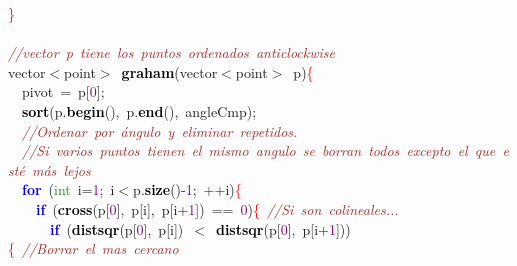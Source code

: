 \mbox{}\textcolor{Red}{\}} \\
\mbox{} \\
\mbox{}\textit{\textcolor{Brown}{//vector\ p\ tiene\ los\ puntos\ ordenados\ anticlockwise}} \\
\mbox{}vector\textcolor{BrickRed}{$<$}point\textcolor{BrickRed}{$>$}\ \textbf{\textcolor{Black}{graham}}\textcolor{BrickRed}{(}vector\textcolor{BrickRed}{$<$}point\textcolor{BrickRed}{$>$}\ p\textcolor{BrickRed}{)}\textcolor{Red}{\{} \\
\mbox{}\ \ pivot\ \textcolor{BrickRed}{=}\ p\textcolor{BrickRed}{[}\textcolor{Purple}{0}\textcolor{BrickRed}{];} \\
\mbox{}\ \ \textbf{\textcolor{Black}{sort}}\textcolor{BrickRed}{(}p\textcolor{BrickRed}{.}\textbf{\textcolor{Black}{begin}}\textcolor{BrickRed}{(),}\ p\textcolor{BrickRed}{.}\textbf{\textcolor{Black}{end}}\textcolor{BrickRed}{(),}\ angleCmp\textcolor{BrickRed}{);} \\
\mbox{}\ \ \textit{\textcolor{Brown}{//Ordenar\ por\ ángulo\ y\ eliminar\ repetidos.}} \\
\mbox{}\ \ \textit{\textcolor{Brown}{//Si\ varios\ puntos\ tienen\ el\ mismo\ angulo\ se\ borran\ todos\ excepto\ el\ que\ esté\ más\ lejos}} \\
\mbox{}\ \ \textbf{\textcolor{Blue}{for}}\ \textcolor{BrickRed}{(}\textcolor{ForestGreen}{int}\ i\textcolor{BrickRed}{=}\textcolor{Purple}{1}\textcolor{BrickRed}{;}\ i\textcolor{BrickRed}{$<$}p\textcolor{BrickRed}{.}\textbf{\textcolor{Black}{size}}\textcolor{BrickRed}{()-}\textcolor{Purple}{1}\textcolor{BrickRed}{;}\ \textcolor{BrickRed}{++}i\textcolor{BrickRed}{)}\textcolor{Red}{\{}\ \ \ \  \\
\mbox{}\ \ \ \ \textbf{\textcolor{Blue}{if}}\ \textcolor{BrickRed}{(}\textbf{\textcolor{Black}{cross}}\textcolor{BrickRed}{(}p\textcolor{BrickRed}{[}\textcolor{Purple}{0}\textcolor{BrickRed}{],}\ p\textcolor{BrickRed}{[}i\textcolor{BrickRed}{],}\ p\textcolor{BrickRed}{[}i\textcolor{BrickRed}{+}\textcolor{Purple}{1}\textcolor{BrickRed}{])}\ \textcolor{BrickRed}{==}\ \textcolor{Purple}{0}\textcolor{BrickRed}{)}\textcolor{Red}{\{}\ \textit{\textcolor{Brown}{//Si\ son\ colineales...}} \\
\mbox{}\ \ \ \ \ \ \textbf{\textcolor{Blue}{if}}\ \textcolor{BrickRed}{(}\textbf{\textcolor{Black}{distsqr}}\textcolor{BrickRed}{(}p\textcolor{BrickRed}{[}\textcolor{Purple}{0}\textcolor{BrickRed}{],}\ p\textcolor{BrickRed}{[}i\textcolor{BrickRed}{])}\ \textcolor{BrickRed}{$<$}\ \textbf{\textcolor{Black}{distsqr}}\textcolor{BrickRed}{(}p\textcolor{BrickRed}{[}\textcolor{Purple}{0}\textcolor{BrickRed}{],}\ p\textcolor{BrickRed}{[}i\textcolor{BrickRed}{+}\textcolor{Purple}{1}\textcolor{BrickRed}{]))}\textcolor{Red}{\{}\ \textit{\textcolor{Brown}{//Borrar\ el\ mas\ cercano}} \\

